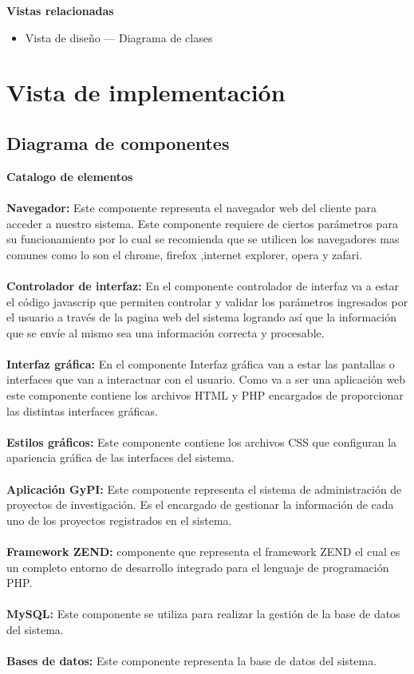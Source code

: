 \documentclass[12pt,oneside,letterpaper]{report}
\begin{document}
\textbf{Vistas relacionadas}
\begin{itemize}
\item Vista de diseño --- Diagrama de clases
\end{itemize}

\section{Vista de implementación}

\subsection{Diagrama de componentes}


\textbf{Catalogo de elementos}\\
\\
\textbf{Navegador:} Este componente representa el navegador web del cliente para acceder a nuestro sistema. Este componente requiere de ciertos parámetros para su funcionamiento por lo cual se recomienda que se utilicen los navegadores mas comunes como lo son el chrome, firefox ,internet explorer, opera y zafari.\\
\\
\textbf{Controlador de interfaz:} En el componente controlador de interfaz va a estar el código javascrip que permiten controlar y validar los parámetros ingresados por el usuario a través de la pagina web del sistema logrando así que la información que se envíe al mismo sea una información correcta y procesable.\\
\\
\textbf{Interfaz gráfica:} En el componente Interfaz gráfica van a estar las pantallas o interfaces que van a interactuar con el usuario. Como va a ser una aplicación web este componente contiene los archivos HTML y PHP encargados de proporcionar las distintas interfaces gráficas.\\
\\
\textbf{Estilos gráficos:} Este componente contiene los archivos CSS que configuran la apariencia gráfica de las interfaces del sistema.\\
\\
\textbf{Aplicación GyPI:} Este componente representa el sistema de administración de proyectos de investigación. Es el encargado de gestionar la información de cada uno de los proyectos registrados en el sistema.\\
\\
\textbf{Framework ZEND:} componente que representa el framework ZEND el cual es un completo entorno de desarrollo integrado para el lenguaje de programación PHP.\\
\\
\textbf{MySQL:} Este componente se utiliza para realizar la gestión de la base de datos del sistema.\\
\\
\textbf{Bases de datos:} Este componente representa la base de datos del sistema.\\
\\
\end{document}
